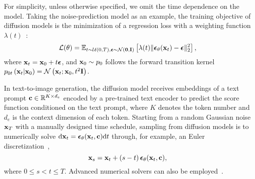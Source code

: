 For simplicity, unless otherwise specified, we omit the time dependence on the model. Taking the noise-prediction model as an example, the training objective of diffusion models is the minimization of a regression loss with a weighting function $\lambda(t)$~\cite{ho2020ddpm,nichol2021improved,kingma2024understanding}:
\begin{equation}
    \label{eq:dm_training}
    \mathcal{L}(\theta) = \mathbb{E}_{t \sim \mathcal{U}(0,T), \boldsymbol{\epsilon} \sim \mathcal{N}(\mathbf{0},\mathbf{I})} \left[\lambda(t) \lVert \boldsymbol{\epsilon}_{\theta}(\mathbf{x}_t) - \boldsymbol{\epsilon} \rVert_2^2\right],
\end{equation}
where $\mathbf{x}_t = \mathbf{x}_0 + t \boldsymbol{\epsilon}$, and $\mathbf{x}_0 \sim p_0$ follows the forward transition kernel $p_{0t}\left(\mathbf{x}_t|\mathbf{x}_0\right) = \mathcal{N}\left(\mathbf{x}_t;\mathbf{x}_0,t^2\mathbf{I}\right)$.

In text-to-image generation, the diffusion model receives embeddings of a text prompt $\mathbf{c} \in \mathbb{R}^{K\times d_e}$ encoded by a pre-trained text encoder to predict the score function conditioned on the text prompt, where $K$ denotes the token number and $d_e$ is the context dimension of each token. Starting from a random Gaussian noise $\mathbf{x}_T$ with a manually designed time schedule, sampling from diffusion models is to numerically solve $\mathrm{d}\mathbf{x}_t = \boldsymbol{\epsilon}_{\theta}(\mathbf{x}_t,\mathbf{c}) \mathrm{d} t$ through, for example, an Euler discretization~\cite{song2021ddim},
\begin{equation}
    \label{eq:euler}
    \mathbf{x}_s = \mathbf{x}_t + \left(s-t\right)\boldsymbol{\epsilon}_{\theta}(\mathbf{x}_t,\mathbf{c}),
\end{equation}
where $0 \leq s < t \leq T$. Advanced numerical solvers can also be employed~\cite{zhang2023deis,zhou2023fast}.

